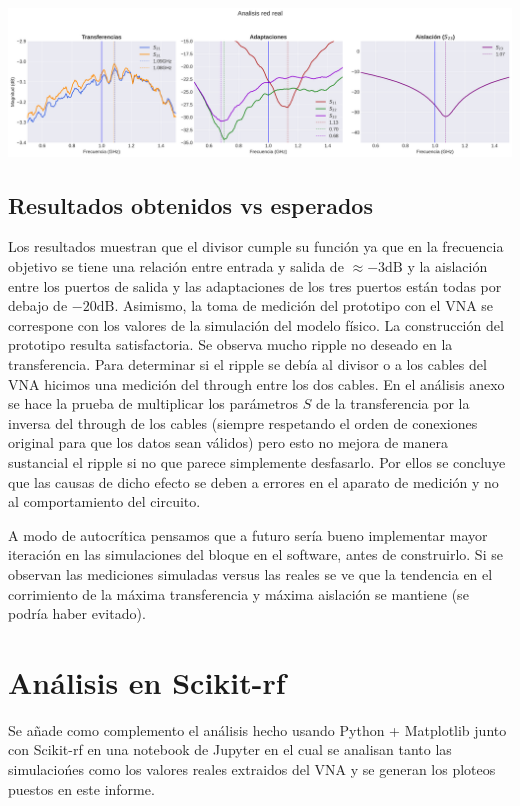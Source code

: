 \documentclass[a4paper, 12pt]{article}
\begin{document}
\includegraphics[width=1\linewidth]{./img/plot-real.png}

\subsection*{Resultados obtenidos vs esperados}
Los resultados muestran que el divisor cumple su función ya que en la frecuencia objetivo se tiene una relación entre entrada y salida de $\approx -3\text{dB}$ y la aislación entre los puertos de salida y las adaptaciones de los tres puertos están todas por debajo de $-20\text{dB}$. Asimismo, la toma de medición del prototipo con el VNA se correspone con los valores de la simulación del modelo físico. La construcción del prototipo resulta satisfactoria.
Se observa mucho ripple no deseado en la transferencia. Para determinar si el ripple se debía al divisor o a los cables del VNA hicimos una medición del through entre los dos cables. En el análisis anexo se hace la prueba de multiplicar los parámetros $S$ de la transferencia por la inversa del through de los cables (siempre respetando el orden de conexiones original para que los datos sean válidos) pero esto no mejora de manera sustancial el ripple si no que parece simplemente desfasarlo. Por ellos se concluye que las causas de dicho efecto se deben a errores en el aparato de medición y no al comportamiento del circuito.

A modo de autocrítica pensamos que a futuro sería bueno implementar mayor iteración en las simulaciones del bloque en el software, antes de construirlo. Si se observan las mediciones simuladas versus las reales se ve que la tendencia en el corrimiento de la máxima transferencia y máxima aislación se mantiene (se podría haber evitado).

\section*{Análisis en Scikit-rf}
Se añade como complemento el análisis hecho usando Python + Matplotlib junto con Scikit-rf en una notebook de Jupyter en el cual se analisan tanto las simulaciońes como los valores reales extraidos del VNA y se generan los ploteos puestos en este informe.
\end{document}
